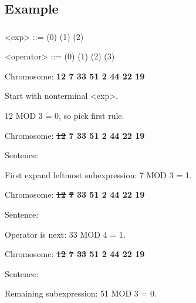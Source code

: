 \documentclass{beamer}
\makeatletter
\newcommand*{\currentname}{\@currentlabelname}
\makeatother
\begin{document}
\subsection{Example}
\begin{frame}
\frametitle{\currentname}
\begin{grammar}
<exp>      ::=       \hfill (0) \hspace{1em}
            \alt {}    					  		\hfill (1) \hspace{1em}
            \alt {}      					  		\hfill (2) \hspace{1em}

<operator> ::=   \lit*{+} 						  		\hfill (0) \hspace{1em}
		    \alt \lit*{-} 						  		\hfill (1) \hspace{1em}
		    \alt \lit*{*} 						  		\hfill (2) \hspace{1em}
		    \alt \lit*{/} 						 		\hfill (3) \hspace{1em}

\end{grammar}

\begin{itemize}

	{	
		\item Chromosome: \textbf{12 7 33 51 2 44 22 19}
		\item Start with nonterminal <exp>.
		\item 12 MOD 3 = 0, so pick first rule.
	}

	{	
		\item Chromosome: \textbf{\sout{12} 7 33 51 2 44 22 19}
		\item Sentence:   
		\item First expand leftmost subexpression: 7 MOD 3 = 1.
	}

	{		
		\item Chromosome: \textbf{\sout{12} \sout{7} 33 51 2 44 22 19}
		\item Sentence:   
		\item Operator is next: 33 MOD 4 = 1.
	}

	{		
		\item Chromosome: \textbf{\sout{12} \sout{7} \sout{33} 51 2 44 22 19}
		\item Sentence:  \lit*{-} 
		\item Remaining subexpression: 51 MOD 3 = 0.
	}


\end{itemize}
\end{frame}
\end{document}
